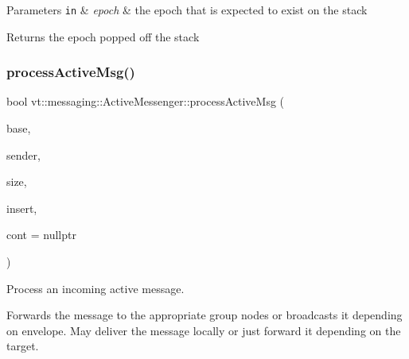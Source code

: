 \begin{DoxyParams}[1]{Parameters}
\mbox{\tt in}  & {\em epoch} & the epoch that is expected to exist on the stack\\
\hline
\end{DoxyParams}
\begin{DoxyReturn}{Returns}
the epoch popped off the stack 
\end{DoxyReturn}
\mbox{\label{structvt_1_1messaging_1_1_active_messenger_acfbb060ad1d13a75d2a061cfde137194}} 
\subsubsection{\texorpdfstring{process\+Active\+Msg()}{processActiveMsg()}}
{\footnotesize\ttfamily bool vt\+::messaging\+::\+Active\+Messenger\+::process\+Active\+Msg (\begin{DoxyParamCaption}\item[{\hyperlink{structvt_1_1messaging_1_1_msg_shared_ptr}{Msg\+Shared\+Ptr}$<$ \hyperlink{namespacevt_a44d0d4e144748f2b19a1cfd962f50338}{Base\+Msg\+Type} $>$ const \&}]{base,  }\item[{\hyperlink{namespacevt_a866da9d0efc19c0a1ce79e9e492f47e2}{Node\+Type} const \&}]{sender,  }\item[{\hyperlink{namespacevt_a408e86a8c7c89309b52907dc5a513924}{Msg\+Size\+Type} const \&}]{size,  }\item[{bool}]{insert,  }\item[{\hyperlink{namespacevt_ae0a5a7b18cc99d7b732cb4d44f46b0f3}{Action\+Type}}]{cont = {\ttfamily nullptr} }\end{DoxyParamCaption})}



Process an incoming active message. 

Forwards the message to the appropriate group nodes or broadcasts it depending on envelope. May deliver the message locally or just forward it depending on the target.


